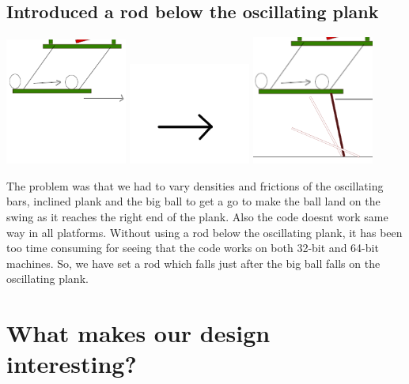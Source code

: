 \documentclass[11pt]{article}
\begin{document}
\subsection{Introduced a rod below the oscillating plank}
\begin{center}
 \includegraphics[width=0.3\textwidth,keepaspectratio]{img/without_rod.png}
 \includegraphics[width=0.3\textwidth,keepaspectratio]{img/arrow.png}
 \includegraphics[width=0.3\textwidth,keepaspectratio]{img/with_rod.png}
\end{center}
	The problem was that we had to vary densities and frictions of the oscillating bars, inclined plank and the big ball to get a go to make the ball land on the swing as it reaches the right end of the plank. Also the code doesnt work same way in all platforms.
	Without using a rod below the oscillating plank, it has been too time 
	consuming for seeing that the code works on both 32-bit and 64-bit machines.
	So, we have set a rod which falls just after the big ball falls on the oscillating plank.

\section{What makes our design interesting?}
\end{document}
